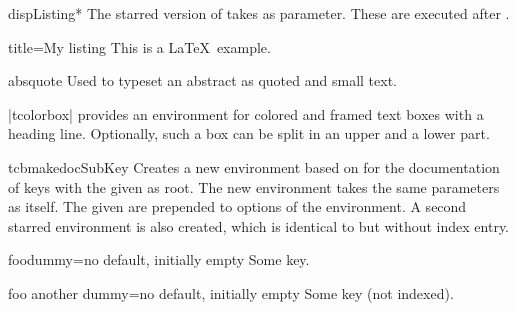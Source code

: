 \begin{docEnvironment}{dispListing*}{}
  The starred version of  takes  
  as parameter. These  are executed after .
\begin{dispExample}
\begin{dispListing*}{title=My listing}
This is a \LaTeX\ example.
\end{dispListing*}
\end{dispExample}
\end{docEnvironment}


\begin{docEnvironment}{absquote}{}
  Used to typeset an abstract as quoted and small text.
\begin{dispExample}
\begin{absquote}
|tcolorbox| provides an environment for colored and framed text boxes with a
heading line. Optionally, such a box can be split in an upper and a lower part.
\end{absquote}
\end{dispExample}
\end{docEnvironment}

\clearpage
\begin{docCommand}[doc updated=2023-12-01]{tcbmakedocSubKey}{}
  Creates a new environment  based on  for the
  documentation of keys with the given  as root.
  The new environment  takes the same para\-meters as  itself.
  The given  are prepended to options of the  environment.
  A second starred environment  is also created, which is identical
  to  but without index entry.
\begin{dispExample}

\begin{docFooKey}{foodummy}{=}{no default, initially empty}
Some key.
\end{docFooKey}

\begin{docFooKey*}{foo another dummy}{=}{no default, initially empty}
Some key (not indexed).
\end{docFooKey*}
\end{dispExample}
\end{docCommand}


